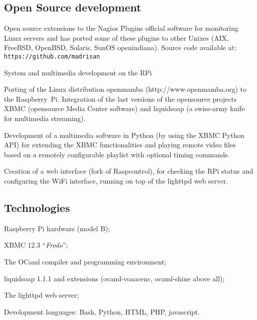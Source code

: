 \subsection{Open Source development}

\noindent
Open source extensions to the 
Nagios Plugins official software for monitoring Linux servers and has ported
some of these plugins to other Unixes (AIX, FreeBSD, OpenBSD, Solaris, 
SunOS openindiana).
Source code available at: {\tt https://github.com/madrisan}


\bigskip
{}
   {System and multimedia development on the RPi}

\noindent
Porting of the Linux distribution openmamba 
({\rm http:/\negthinspace/www.openmamba.org}) to the Raspberry~Pi.
Integration of the last versions of the opensource projects XBMC 
(opensource Media Center software) and liquidsoap 
(a swiss-army knife for multimedia streaming).

Development of a multimedia software in Python (by using the XBMC Python API)
for extending the XBMC functionalities and playing remote video files based on
a remotely configurable playlist with optional timing commands.

Creation of a web interface (fork of Raspcontrol), for checking the RPi status
and configuring the WiFi interface, running on top of the lighttpd web server.

\subsection{Technologies}

\item{\bdot} Raspberry Pi hardware (model B);
\item{\bdot} XBMC 12.3 ``{\it Frodo\/}'';
\item{\bdot} The OCaml compiler and programming environment;
\item{\bdot} liquidsoap 1.1.1 and extensions (ocaml-voaacenc, ocaml-shine above all);
\item{\bdot} The lighttpd web server;
\item{\bdot} Development languages: Bash, Python, HTML, PHP, javascript.


\bigskip
{}

